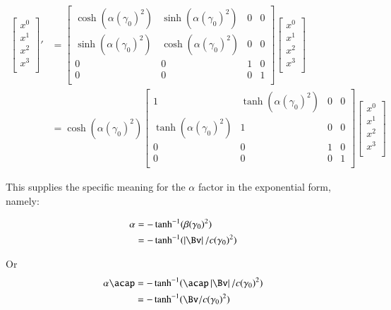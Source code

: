 \documentclass{article}
\begin{document}
\begin{align*}
{\begin{bmatrix}
x^0 \\
x^1 \\
x^2 \\
x^3 \\
\end{bmatrix}}'
&=
\begin{bmatrix}
\cosh(\alpha(\gamma_0)^2) & \sinh(\alpha(\gamma_0)^2) & 0 & 0 \\
\sinh(\alpha(\gamma_0)^2) & \cosh(\alpha(\gamma_0)^2) & 0 & 0 \\
0 & 0 & 1 & 0 \\
0 & 0 & 0 & 1 \\
\end{bmatrix}
\begin{bmatrix}
x^0 \\
x^1 \\
x^2 \\
x^3 \\
\end{bmatrix} \\
&=
\cosh(\alpha(\gamma_0)^2) 
\begin{bmatrix}
1                         & \tanh(\alpha(\gamma_0)^2) & 0 & 0 \\
\tanh(\alpha(\gamma_0)^2) & 1                         & 0 & 0 \\
0 & 0 & 1 & 0 \\
0 & 0 & 0 & 1 \\
\end{bmatrix}
\begin{bmatrix}
x^0 \\
x^1 \\
x^2 \\
x^3 \\
\end{bmatrix}
\end{align*}

This supplies the specific meaning for the $\alpha$ factor in the exponential form, namely:

\begin{align*}
\alpha
&= -\tanh^{-1}(\beta (\gamma_0)^2) \\
&= -\tanh^{-1}(\Abs{\Bv}/c (\gamma_0)^2)
\end{align*}

Or
\begin{align*}
\alpha \acap
&= -\tanh^{-1}(\acap \Abs{\Bv}/c (\gamma_0)^2) \\
&= -\tanh^{-1}(\Bv/c (\gamma_0)^2) \\
\end{align*}
\end{document}
